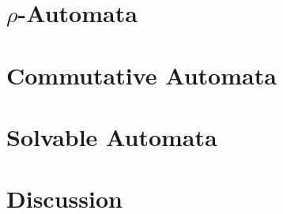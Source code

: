 

\section{\texorpdfstring{$\rho$}{rho}-Automata}
\label{prelim:subclasses:rho-automata} 



\section{Commutative Automata}
\label{prelim:subclasses:commutative}



\section{Solvable Automata}
\label{prelim:subclasses:solvable} 



\section{Discussion}
\label{prelim:subclasses:discussion}

